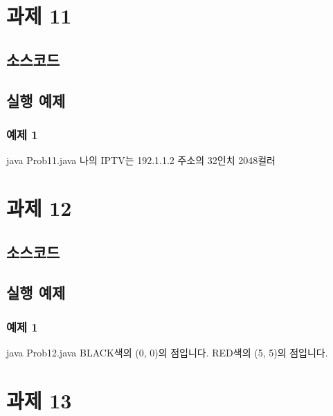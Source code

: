\documentclass{article}
\theoremstyle{nonumberplain}
\begin{document}
\section{과제 11}
\subsection{소스코드}
\subsection{실행 예제}
\subsubsection{예제 1}
\begin{console}
java Prob11.java
나의 IPTV는 192.1.1.2 주소의 32인치 2048컬러
\end{console}



\section{과제 12}
\subsection{소스코드}
\subsection{실행 예제}
\subsubsection{예제 1}
\begin{console}
java Prob12.java
BLACK색의 (0, 0)의 점입니다.
RED색의 (5, 5)의 점입니다.
\end{console}



\section{과제 13}
\end{document}
